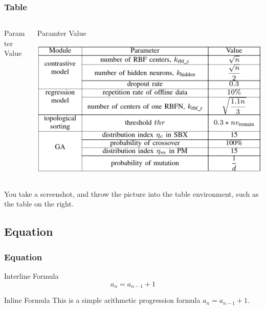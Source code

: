 \documentclass[
    10pt,
    pdf,
    UTF8,
    aspectratio=169
]{beamer}
\begin{document}
\begin{frame}
    \frametitle{Table}
    \begin{columns}
        \begin{column}{0.3\textwidth}
            \begin{table}
                \centering
                \caption{Paramter Value}
                \label{tb:paramter}
                
            \end{table}
        \end{column}
        \begin{column}{0.7\textwidth}
            \begin{table}
                \centering
                \caption{Paramter Value}
                \label{tb:figure}
                \includegraphics[width=1\textwidth]{./table/figure.png}
            \end{table}
        \end{column}
    \end{columns}
    \hspace{2em} You take a screenshot, and throw the picture into the table environment, such as the table on the right.
\end{frame}

\subsection{Equation}
\begin{frame}
    \frametitle{Equation}
    \begin{block}{Interline Formula}
        \begin{equation}
            \label{eq:example}
            a_n = a_{n-1} + 1
        \end{equation}
    \end{block}
    \begin{block}{Inline Formula}
        This is a simple arithmetic progression formula $a_n = a_{n-1} + 1$.
    \end{block}
\end{frame}
\end{document}
